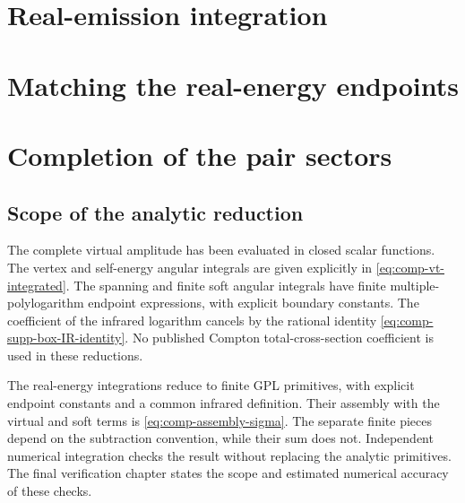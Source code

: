 
\section{Real-emission integration}


\section{Matching the real-energy endpoints}



\section{Completion of the pair sectors}




\subsection{Scope of the analytic reduction}
The complete virtual amplitude has been evaluated in closed scalar
functions. The vertex and self-energy angular integrals are given
explicitly in \eqref{eq:comp-vt-integrated}. The spanning and finite
soft angular integrals have finite multiple-polylogarithm endpoint
expressions, with explicit boundary constants. The coefficient
of the infrared logarithm cancels by the rational identity
\eqref{eq:comp-supp-box-IR-identity}. No published Compton
total-cross-section coefficient is used in these reductions.

The real-energy integrations reduce to finite GPL primitives, with
explicit endpoint constants and a common infrared definition.
Their assembly with the virtual and soft terms is
\eqref{eq:comp-assembly-sigma}. The separate finite pieces depend on
the subtraction convention, while their sum does not.
Independent numerical integration checks the result without
replacing the analytic primitives. The final verification chapter states the scope and estimated
numerical accuracy of these checks.
